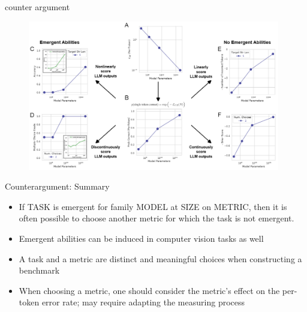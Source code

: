 
\begin{vbframe}{counter argument}

\vfill

	\begin{figure}
		\centering
		\includegraphics[width = 11cm]{figure/emergent_experiments.png}\\ 
	\end{figure}

\vfill

\end{vbframe}


\begin{vbframe}{Counterargument: Summary}

\vfill

%
\begin{itemize}
%
\item
If TASK is emergent for family MODEL at SIZE on METRIC, then
it is often possible to choose another metric for which the
task is not emergent.
%
\item Emergent abilities can be induced in computer vision tasks as well
%
\item A task and a metric are distinct and meaningful choices when constructing a benchmark
%
\item When choosing a metric, one should consider the
metric's effect on the per-token error rate;
may require adapting the measuring process
%
\end{itemize}


\vfill

\end{vbframe}

